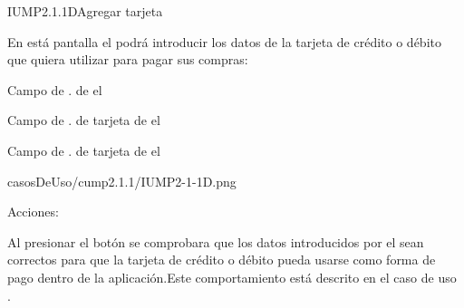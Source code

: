 \begin{IU}{IUMP2.1.1D}{Agregar tarjeta}{En está pantalla el  podrá introducir los datos de la tarjeta de crédito o débito que quiera utilizar para pagar sus compras:
	\begin{Citemize}
		\item Campo de . de el 
		\item  Campo de . de tarjeta de el 
		\item  Campo de . de tarjeta de el 
	\end{Citemize}}
{casosDeUso/cump2.1.1/IUMP2-1-1D.png}
	\item[Acciones:]
		\item {}Al presionar el botón se comprobara que los datos introducidos por el  sean correctos para que la tarjeta de crédito o débito pueda usarse como forma de pago dentro de la aplicación.Este comportamiento está descrito en el caso de uso .
\end{IU}